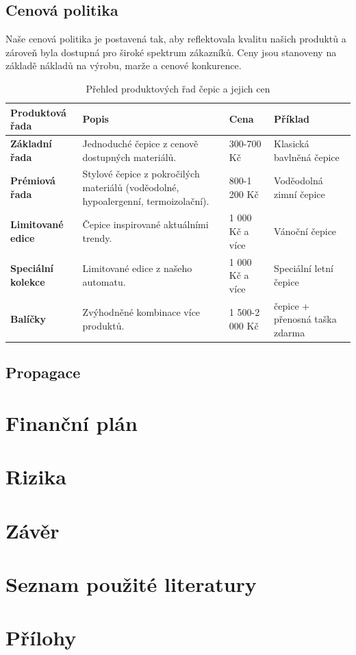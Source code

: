 \documentclass[12pt, a4paper]{article}
\begin{document}
\subsection{Cenová politika}

Naše cenová politika je postavená tak, aby reflektovala kvalitu našich produktů
a zároveň byla dostupná pro široké spektrum zákazníků.
Ceny jsou stanoveny na základě nákladů na výrobu, marže a cenové konkurence.

\renewcommand{\arraystretch}{1.2}

\begin{table}[h!]
  \centering
  \begin{tabularx}{\textwidth}{ |>{\raggedright\arraybackslash}X||>{\raggedright\arraybackslash}X|X|>{\raggedright\arraybackslash}X| }
    \hline
    \textbf{Produktová řada} & \textbf{Popis} & \textbf{Cena} & \textbf{Příklad} \\
    \hline
    \hline
    \textbf{Základní řada} 
    & Jednoduché čepice z cenově dostupných materiálů. 
    & 300-700 Kč 
    & Klasická bavlněná čepice \\
    \hline
    \textbf{Prémiová řada} 
    & Stylové čepice z pokročilých materiálů (voděodolné, hypoalergenní, termoizolační). 
    & 800-1 200 Kč 
    & Voděodolná zimní čepice \\
    \hline
    \textbf{Limitované edice} 
    & Čepice inspirované aktuálními trendy. 
    & 1 000 Kč a více 
    & Vánoční čepice \\
    \hline
    \textbf{Speciální kolekce} 
    & Limitované edice z našeho automatu. 
    & 1 000 Kč a více 
    & Speciální letní čepice \\
    \hline
    \textbf{Balíčky} 
    & Zvýhodněné kombinace více produktů. 
    & 1 500-2 000 Kč 
    & 2 čepice + přenosná taška zdarma \\
    \hline
  \end{tabularx}
  \caption{Přehled produktových řad čepic a jejich cen}
\end{table}


\subsection{Propagace}

\section{Finanční plán}
\section{Rizika}
\section{Závěr}
\section{Seznam použité literatury}
\printbibliography[heading=none]
\section{Přílohy}

\listoftables
\end{document}
